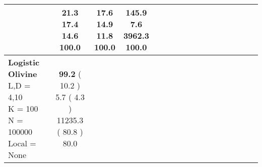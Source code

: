 \documentclass[9pt]{article}
\begin{document}
\begin{landscape}
\begin{longtable}{ l | c c c c | c c c c | c c c c | c c c c |}
             &
                            \makecell{              21.3
     \\
            {\footnotesize             17.4
    } \\  {\footnotesize             14.6
     } \\
            {\small \textcolor[rgb]{ 0.2 , 0.7 , 0.1} {100.0  }
} }
             &                         \makecell{              17.6
     \\
            {\footnotesize             14.9
    } \\  {\footnotesize             11.8
     } \\
            {\small \textcolor[rgb]{ 0.2 , 0.7 , 0.1} {100.0  }
} }
             &
                            \makecell{              145.9
     \\
            {\footnotesize             7.6
    } \\  {\footnotesize             3962.3
     } \\
            {\small \textcolor[rgb]{ 0.2 , 0.7 , 0.1} {100.0  }
} }
            

 \\
                                                            
                    \hline
                    \makecell{ \textbf{ Logistic Olivine} \\
                    { \small L,D = 4,10} \\
                    {\small K = 100} \\
                    {\small N = 100000 } \\ {\small Local = None }} &
                    
                            \makecell{              \textbf{ 99.2 }
     (             10.2
    ) \\
            {\footnotesize             5.7
     (              4.3
     )} \\
            {\footnotesize             11235.3
     (            80.8
    ) } \\
            {\small  \textcolor[rgb]{ 0.6 , 0.301 , 0.1} {80.0  }
} }



\end{longtable}
\end{landscape}
\end{document}
